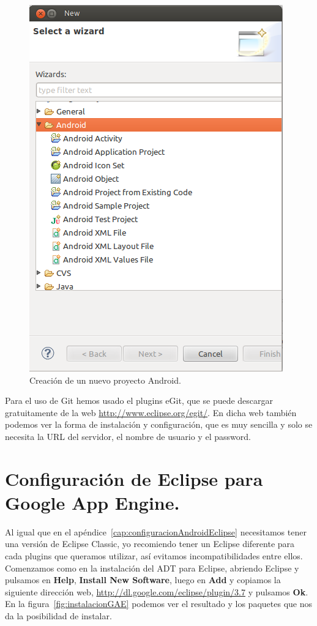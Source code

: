 \begin{figure}
  \centering
    \includegraphics[scale=0.6]{./AnexoConfiguracionEclipse/imagenes/nuevoProyectoAndroid.png}
  \caption{Creación de un nuevo proyecto Android.}
  \label{fig:nuevoProyectoAndroid}
\end{figure}

Para el uso de Git hemos usado el plugins eGit, que se puede descargar gratuitamente de la web \url{http://www.eclipse.org/egit/}. En dicha web también podemos ver la forma de instalación y configuración, que es muy sencilla y solo se necesita la URL del servidor, el nombre de usuario y el password.

\section{Configuración de Eclipse para Google App Engine.}\label{cap:configuracionGAEEclipse}

Al igual que en el apéndice~\ref{cap:configuracionAndroidEclipse} necesitamos tener una versión de Eclipse Classic, yo recomiendo tener un Eclipse diferente para cada plugins que queramos utilizar, así evitamos incompatibilidades entre ellos. Comenzamos como en la instalación del ADT para Eclipse, abriendo Eclipse y pulsamos en \textbf{Help}, \textbf{Install New Software}, luego en \textbf{Add} y copiamos la siguiente dirección web, \url{http://dl.google.com/eclipse/plugin/3.7} y pulsamos \textbf{Ok}. En la figura~\ref{fig:instalacionGAE} podemos ver el resultado y los paquetes que nos da la posibilidad de instalar.

